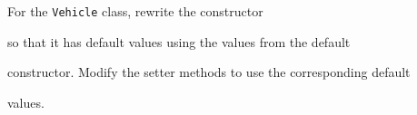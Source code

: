 For the \texttt{Vehicle} class, rewrite the constructor

so that it has default values using the values from the default

constructor. Modify the setter methods to use the corresponding default

values.

